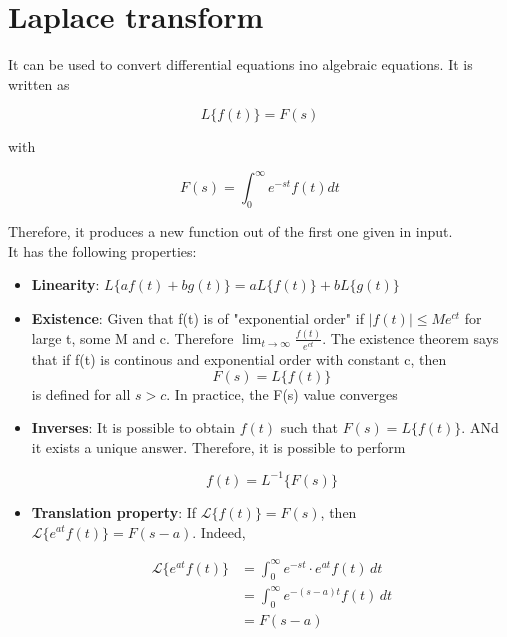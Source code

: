 \section{Laplace transform} \label{chap: laplace}

It can be used to convert differential equations ino algebraic equations. It is written as

\begin{equation}
    L\{f(t)\} = F(s)
\end{equation}

with

\begin{equation}
    F(s) = \int_0^\infty{e^{-st} f(t) dt}
\end{equation}

Therefore, it produces a new function out of the first one given in input.\\

It has the following properties:
\begin{itemize}

    \item \textbf{Linearity}: $L\{a f(t) + b g(t)\} = a L\{f(t)\} + b L\{g(t)\}$ 
    \item \textbf{Existence}: Given that f(t) is of "exponential order" if $|f(t)| \le M e^{ct}$ for large t, some M and c. Therefore $\lim_{t \rightarrow \infty}{\frac{f(t)}{e^{ct}}}$. The existence theorem says that if f(t) is continous and exponential order     with constant c, then
    $$
        F(s) = L\{f(t)\}
    $$
    is defined for all $s > c$. In practice, the F(s) value converges
    \item \textbf{Inverses}: It is possible to obtain $f(t)$ such that $F(s) = L\{f(t)\}$. ANd it exists a unique answer.
    Therefore, it is possible to perform

    \[
    f(t) = L^{-1}\{F(s)\}    
    \]

    \item \textbf{Translation property}: If \( \mathcal{L}\{f(t)\} = F(s) \), then \( \mathcal{L}\{e^{at} f(t)\} = F(s - a) \). Indeed,

    \begin{align*}
        \mathcal{L}\{e^{at} f(t)\} &= \int_0^\infty e^{-st} \cdot e^{at} f(t) \, dt \\
        &= \int_0^\infty e^{-(s - a)t} f(t) \, dt \\
        &= F(s - a)
    \end{align*}
\end{itemize}



